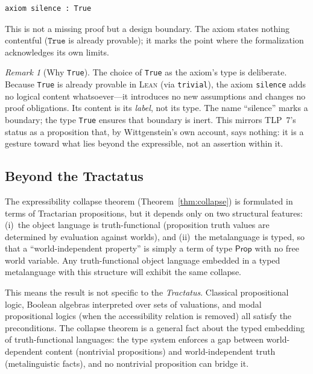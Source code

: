 \documentclass[10pt, letterpaper]{article}
\theoremstyle{definition}
\theoremstyle{remark}
\newtheorem{remark}[theorem]{Remark}
\newcommand{\Prop}{\mathsf{Prop}}
\newcommand{\Lean}{\textsc{Lean}}
\begin{document}
\begin{lstlisting}
axiom silence : True
\end{lstlisting}

\noindent
This is not a missing proof but a design boundary.  The axiom
states nothing contentful ($\mathtt{True}$ is already provable);
it marks the point where the formalization acknowledges its own
limits.

\begin{remark}[Why \texttt{True}]
\label{rem:why-true}
The choice of \texttt{True} as the axiom's type is deliberate.
Because \texttt{True} is already provable in \Lean{} (via
\texttt{trivial}), the axiom \texttt{silence} adds no logical
content whatsoever---it introduces no new assumptions and
changes no proof obligations.  Its content is its \emph{label},
not its type.  The name ``silence'' marks a boundary; the
type \texttt{True} ensures that boundary is inert.  This
mirrors TLP~7's status as a proposition that, by Wittgenstein's
own account, says nothing: it is a gesture toward what lies
beyond the expressible, not an assertion within it.
\end{remark}

\subsection{Beyond the Tractatus}
\label{sec:beyond}

The expressibility collapse theorem
(Theorem~\ref{thm:collapse}) is formulated in terms of
Tractarian propositions, but it depends only on two structural
features: (i)~the object language is truth-functional
(proposition truth values are determined by evaluation against
worlds), and (ii)~the metalanguage is typed, so that a
``world-independent property'' is simply a term of type
$\Prop$ with no free world variable.  Any truth-functional
object language embedded in a typed metalanguage with this
structure will exhibit the same collapse.

This means the result is not specific to the
\emph{Tractatus}.  Classical propositional logic, Boolean
algebras interpreted over sets of valuations, and modal
propositional logics (when the accessibility relation is
removed) all satisfy the preconditions.  The collapse theorem
is a general fact about the typed embedding of truth-functional
languages: the type system enforces a gap between
world-dependent content (nontrivial propositions) and
world-independent truth (metalinguistic facts), and no
nontrivial proposition can bridge it.
\end{document}
